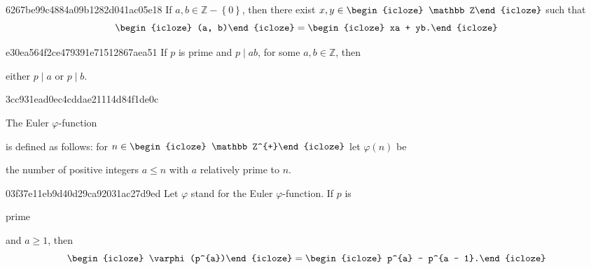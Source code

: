 \begin{note}{6267be99c4884a09b1282d041ac05e18}
    If \({ a, b \in \mathbb Z - \left\{ 0 \right\} }\), then there exist \({ x, y \in \begin{icloze}{3}\mathbb Z\end{icloze} }\) such that
    \[
        \begin{icloze}{2}(a, b)\end{icloze} = \begin{icloze}{1}xa + yb.\end{icloze}
    \]
\end{note}

\begin{note}{e30ea564f2ce479391e71512867aea51}
    If \({ p }\) is prime and \({ p \mid ab }\), for some \({ a, b \in \mathbb Z }\), then
    \begin{icloze}{1}
        \begin{center}
            either \({ p \mid a }\) or \({ p \mid b }\).
        \end{center}
    \end{icloze}
\end{note}

\begin{note}{3cc931ead0ec4cddae21114d84f1de0c}
    \begin{icloze}{3}The Euler \({ \varphi }\)-function\end{icloze} is defined as follows: for \({ n \in \begin{icloze}{2}\mathbb Z^{+}\end{icloze} }\) let \({ \varphi(n) }\) be \begin{icloze}{1}the number of positive integers \({ a \leq n }\) with \({ a }\) relatively prime to \({ n }\).\end{icloze}
\end{note}

\begin{note}{03f37e11eb9d40d29ca92031ac27d9ed}
    Let \({ \varphi }\) stand for the Euler \({ \varphi }\)-function.
    If \({ p }\) is \begin{icloze}{3}prime\end{icloze} and \({ a \geq 1 }\), then
    \[
        \begin{icloze}{2}\varphi(p^{a})\end{icloze} = \begin{icloze}{1}p^{a} - p^{a - 1}.\end{icloze}
    \]
\end{note}

